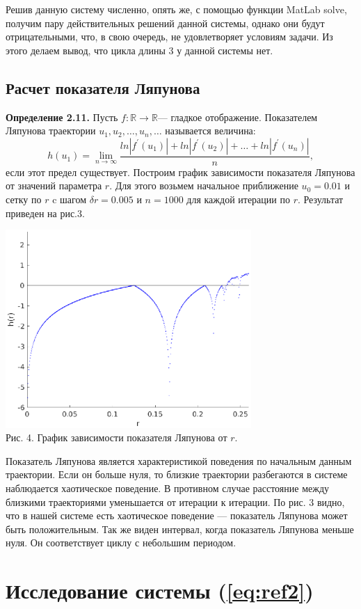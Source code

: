 \documentclass[11pt]{article}
\begin{document}
	{Решив данную систему численно, опять же, с помощью функции MatLab solve, получим пару действительных решений данной системы, однако они будут отрицательными, что, в свою очередь, не удовлетворяет условиям задачи. Из этого делаем вывод, что цикла длины 3 у данной системы нет.}
	{\subsection{Расчет показателя Ляпунова}}
	{\textbf{Определение 2.11.} Пусть $f: \mathds{R} \rightarrow \mathds{R}$--- гладкое отображение. Показателем Ляпунова траектории $u_1,u_2,\ldots,u_n,\ldots$ называется величина:}
	\[ h(u_1) = \lim_{n\to\infty}\frac{ln|f^{'}(u_1)| + ln|f^{'}(u_2)| + \ldots + ln|f^{'}(u_n)|}{n},\]
	{если этот предел существует.}
	{Построим график зависимости показателя Ляпунова от значений параметра $r$. Для этого возьмем начальное приближение $u_0 = 0.01$ и сетку по $r$ c шагом $\delta r = 0.005$ и $n = 1000$ для каждой итерации по $r$. Результат приведен на рис.3.}
	\begin{center}
		\includegraphics[width=0.7\textwidth]{lapunov_1.eps}\\
		{Рис. 4. График зависимости показателя Ляпунова от $r$.}
	\end{center}
	{Показатель Ляпунова является характеристикой поведения по начальным данным траектории. Если он больше нуля, то близкие траектории разбегаются в системе наблюдается хаотическое поведение. В противном случае расстояние между близкими траекториями уменьшается от итерации к итерации. По рис. 3 видно, что в нашей системе есть хаотическое поведение --- показатель Ляпунова может быть положительным. Так же виден интервал, когда показатель Ляпунова меньше нуля. Он соответствует циклу с небольшим периодом.}
	\newpage
	{\vspace*{-2cm} \hspace*{-1cm}\section{Исследование системы (\ref{eq:ref2})} }
\end{document}
